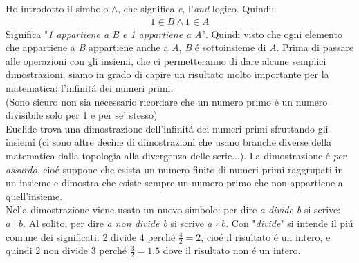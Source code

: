 \documentclass[twoside]{article} %
\begin{document}
	Ho introdotto il simbolo $\wedge$, che significa \textit{e}, l'\textit{and} logico. Quindi:
	\begin{gather*}
		1\in B \wedge 1\in A
	\end{gather*}
	Significa "\textit{1 appartiene a \textit{B} e 1 appartiene a \textit{A}}". Quindi visto che ogni elemento che appartiene a \textit{B} appartiene anche a \textit{A}, \textit{B} \'e sottoinsieme di \textit{A}.
	Prima di passare alle operazioni con gli insiemi, che ci permetteranno di dare alcune semplici dimostrazioni, siamo in grado di capire un risultato molto importante per la matematica: l'infinit\'a dei numeri primi.\\
	(Sono sicuro non sia necessario ricordare che un numero primo \'e un numero divisibile solo per 1 e per se' stesso)\\ Euclide trova una dimostrazione dell'infinit\'a dei numeri primi sfruttando gli insiemi (ci sono altre decine di dimostrazioni che usano branche diverse della matematica dalla topologia alla divergenza delle serie...). La dimostrazione \'e \textit{per assurdo}, cio\'e suppone che esista un numero finito di numeri primi raggrupati in un insieme e dimostra che esiste sempre un numero primo che non appartiene a quell'insieme.\\
	Nella dimostrazione viene usato un nuovo simbolo: per dire \textit{a divide b} si scrive: $a\mid b$. Al solito, per dire \textit{a non divide b} si scrive $a\nmid b$. Con "\textit{divide}" si intende il pi\'u comune dei significati: 2 divide 4 perch\'e $\frac{4}{2}=2$, cio\'e il risultato \'e un intero, e quindi 2 non divide 3 perch\'e $\frac{3}{2}=1.5$ dove il risultato non \'e un intero.
	\newpage
	
\end{document}
